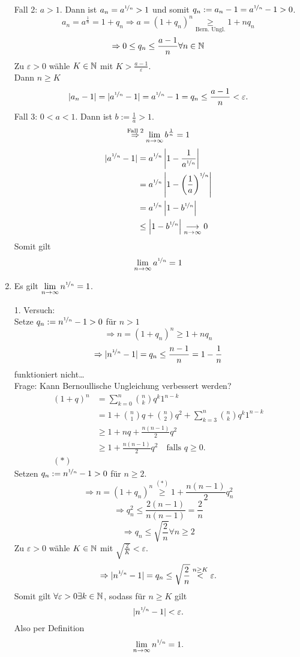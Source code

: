 \documentclass[../ana1.tex]{subfiles}
\begin{document}
\begin{bsp}
\begin{enumerate}
\begin{bew}
			Fall 2: \(a>1\). Dann ist \(a_n = a^{\nicefrac{1}{n}}>1\) und somit \(q_n := a_n-1 = a^{\nicefrac{1}{n}} -1 >0\).\\
			\[a_n = a^{\frac{1}{n}} = 1+q_n \Rightarrow a = {(1+q_n)}^n \underset{\text{Bern.\ Ungl.}}{\geq} 1+ nq_n\]
			\[\Rightarrow 0 \leq q_n \leq \frac{a-1}{n} \forall n\in\mathbb{N} \]
			Zu \(\varepsilon > 0\) wähle \(K\in\mathbb{N} \) mit \(K>\frac{a-1}{\varepsilon}\).\\
			Dann \(n\geq K\)
			\[|a_n-1| = |a^{\nicefrac{1}{n}}-1|= a^{\nicefrac{1}{n}} -1 = q_n \leq \frac{a-1}{n} < \varepsilon.\]
			Fall 3: \(0<a<1\). Dann ist \(b := \frac{1}{a}>1\).
			\[\overset{\text{Fall 2}}{\Rightarrow} \lim\limits_{n\rightarrow\infty} b^{\frac{1}{n}} = 1\]
			\begin{align*}
				|a^{\nicefrac{1}{n}}-1|&=a^{\nicefrac{1}{n}}\left|1-\frac{1}{a^{\nicefrac{1}{n}}}\right|\\
				&= a^{\nicefrac{1}{n}}\left| 1 - {\left(\frac{1}{a}\right)}^{\nicefrac{1}{n}} \right|\\
				&= a^{\nicefrac{1}{n}} \left|1-b^{\nicefrac{1}{n}}\right|\\
				&\leq \left|1-b^{\nicefrac{1}{n}} \right|\underset{n\rightarrow\infty}{\longrightarrow} 0
			\end{align*}
			Somit gilt
			\[\lim\limits_{n\rightarrow\infty} a^{\nicefrac{1}{n}} = 1\]
		\end{bew}
	\item Es gilt \(\lim\limits_{n\rightarrow\infty}n^{\nicefrac{1}{n}}=1\).
	\begin{bew}
		1. Versuch:\\
		Setze \(q_n := n^{\nicefrac{1}{n}} -1>0\) für \(n>1\) \\
		\[\Rightarrow n={(1+q_n)}^n \geq 1+nq_n\]
		\[\Rightarrow |n^{\nicefrac{1}{n}}-1| = q_n \leq \frac{n-1}{n} = 1-\frac{1}{n}\]
		funktioniert nicht\dots \\
		Frage: Kann Bernoullische Ungleichung verbessert werden?\\
		\begin{align*}
			{(1+q)}^n &= \sum_{k=0}^{n} \binom{n}{k} q^k1^{n-k}\\
			&=1+\binom{n}{1}q + \binom{n}{2}q^2 + \sum_{k=3}^{n}\binom{n}{k} q^k1^{n-k}\\
			&\geq 1+nq + \frac{n(n-1)}{2} q^2\\
			&\geq 1+\frac{n(n-1)}{2} q^2 \quad\text{falls }	q\geq 0.\\
			(*)
		\end{align*}
		Setzen \(q_n := n^{\nicefrac{1}{n}} -1 >0\) für \(n\geq 2\).
		\[\Rightarrow n = {(1+q_n)}^n \overset{(*)}{\geq}1+\frac{n(n-1)}{2} q_n^2\]
		\[\Rightarrow q_n^2 \leq \frac{2(n-1)}{n(n-1)} = \frac{2}{n}\]
		\[\Rightarrow q_n \leq \sqrt{\frac{2}{n}} \forall n\geq 2\]
		Zu \(\varepsilon >0\) wähle \(K\in\mathbb{N} \) mit \(\sqrt{\frac{2}{K}}<\varepsilon \).
		\[\Rightarrow |n^{\nicefrac{1}{n}} -1| = q_n \leq \sqrt{\frac{2}{n}} \overset{n\geq K}{<} \varepsilon.\]
		Somit gilt \(\forall\varepsilon>0\exists k\in\mathbb{N} \), sodass für \(n\geq K\) gilt
		\[|n^{\nicefrac{1}{n}} - 1| <\varepsilon.\]
		Also per Definition
		\[\lim\limits_{n\rightarrow\infty} n^{\nicefrac{1}{n}} = 1.\]
	\end{bew}
	\end{enumerate}
\end{bsp}
\end{document}
